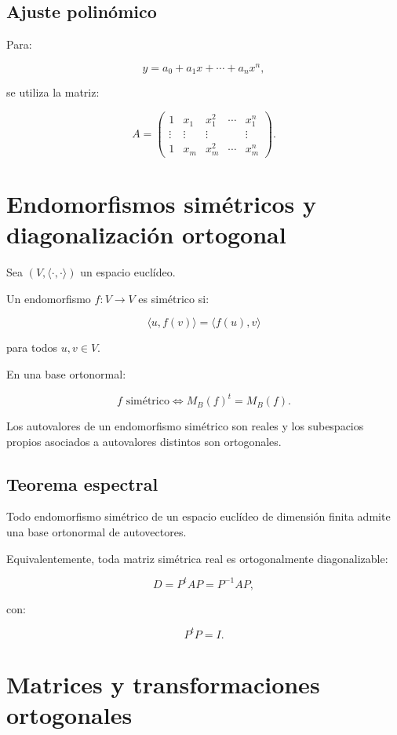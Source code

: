 \documentclass[11pt,a4paper]{article}
\begin{document}
\subsection{Ajuste polinómico}

Para:

\[
y=a_0+a_1x+\cdots+a_nx^n,
\]

se utiliza la matriz:

\[
A=
\begin{pmatrix}
1&x_1&x_1^2&\cdots&x_1^n\\
\vdots&\vdots&\vdots&&\vdots\\
1&x_m&x_m^2&\cdots&x_m^n
\end{pmatrix}.
\]

\section{Endomorfismos simétricos y diagonalización ortogonal}

Sea $(V,\langle\cdot,\cdot\rangle)$ un espacio euclídeo.

Un endomorfismo $f:V\to V$ es simétrico si:

\[
\boxed{
\langle u,f(v)\rangle
=
\langle f(u),v\rangle
}
\]

para todos $u,v\in V$.

En una base ortonormal:

\[
\boxed{
f\text{ simétrico}
\iff
M_B(f)^t=M_B(f).
}
\]

Los autovalores de un endomorfismo simétrico son reales y los subespacios propios asociados a autovalores distintos son ortogonales.

\subsection{Teorema espectral}

Todo endomorfismo simétrico de un espacio euclídeo de dimensión finita admite una base ortonormal de autovectores.

Equivalentemente, toda matriz simétrica real es ortogonalmente diagonalizable:

\[
\boxed{
D=P^tAP=P^{-1}AP,
}
\]

con:

\[
\boxed{
P^tP=I.
}
\]

\section{Matrices y transformaciones ortogonales}
\end{document}
